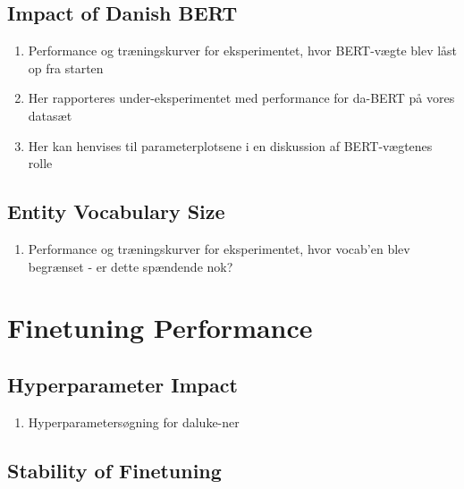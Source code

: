 \documentclass[main.tex]{subfiles}
\begin{document}
\subsection{Impact of Danish BERT}
\begin{enumerate}
    \item Performance og træningskurver for eksperimentet, hvor BERT-vægte blev låst op fra starten
    \item Her rapporteres under-eksperimentet med performance for da-BERT på vores datasæt
    \item Her kan henvises til parameterplotsene i en diskussion af BERT-vægtenes rolle
\end{enumerate}

\subsection{Entity Vocabulary Size}

\begin{enumerate}
    \item Performance og træningskurver for eksperimentet, hvor vocab'en blev begrænset - er dette spændende nok?
\end{enumerate}

\section{Finetuning Performance}

\subsection{Hyperparameter Impact}

\begin{enumerate}
    \item Hyperparametersøgning for daluke-ner
\end{enumerate}

\subsection{Stability of Finetuning}
\end{document}
